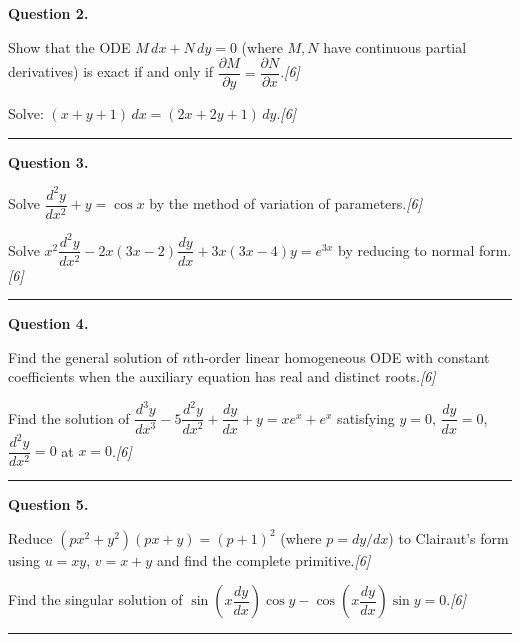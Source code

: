 \documentclass[11pt,a4paper]{article}
\newcommand{\pts}[1]{\hfill   \textit{[#1]}}
\begin{document}
\medskip


\noindent   \textbf{Question 2.}

\begin{parts}
  \item Show that the ODE $M\,dx+N\,dy=0$ (where $M,N$ have continuous partial derivatives) is exact if and only if $\dfrac{\partial M}{\partial y}=\dfrac{\partial N}{\partial x}$.\pts{6}
  \item Solve: $(x+y+1)\,dx=(2x+2y+1)\,dy$.\pts{6}
\end{parts}
\medskip\rule{\linewidth}{0.2pt}

\medskip


\noindent   \textbf{Question 3.}

\begin{parts}
  \item Solve $\dfrac{d^2y}{dx^2}+y=\cos x$ by the method of variation of parameters.\pts{6}
  \item Solve $x^2\dfrac{d^2y}{dx^2}-2x(3x-2)\dfrac{dy}{dx}+3x(3x-4)y=e^{3x}$ by reducing to normal form.\pts{6}
\end{parts}
\medskip\rule{\linewidth}{0.2pt}

\medskip


\noindent   \textbf{Question 4.}

\begin{parts}
  \item Find the general solution of $n$th-order linear homogeneous ODE with constant coefficients when the auxiliary equation has real and distinct roots.\pts{6}
  \item Find the solution of $\dfrac{d^3y}{dx^3}-5\dfrac{d^2y}{dx^2}+\dfrac{dy}{dx}+y=xe^x+e^x$ satisfying $y=0$, $\dfrac{dy}{dx}=0$, $\dfrac{d^2y}{dx^2}=0$ at $x=0$.\pts{6}
\end{parts}
\medskip\rule{\linewidth}{0.2pt}

\medskip


\noindent   \textbf{Question 5.}

\begin{parts}
  \item Reduce $(px^2+y^2)(px+y)=(p+1)^2$ (where $p=dy/dx$) to Clairaut's form using $u=xy$, $v=x+y$ and find the complete primitive.\pts{6}
  \item Find the singular solution of $\sin\!\left(x\dfrac{dy}{dx}\right)\cos y - \cos\!\left(x\dfrac{dy}{dx}\right)\sin y = 0$.\pts{6}
\end{parts}
\medskip\rule{\linewidth}{0.2pt}

\medskip
\end{document}
